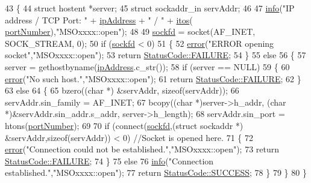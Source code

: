 \begin{DoxyCode}
43 \{
44     \textcolor{keyword}{struct }hostent *server;
45     \textcolor{keyword}{struct }sockaddr\_in servAddr;
46 
47     \hyperlink{classObject_a644fd329ea4cb85f54fa6846484b84a8}{info}(\textcolor{stringliteral}{"IP address / TCP Port: "} + \hyperlink{classMSOxxxx_aa55bdb0feb799b195628fe6ef0222b62}{ipAddress} + \textcolor{stringliteral}{" / "} + \hyperlink{Tools_8h_af330027dbdafb9a30768b3613c553e60}{itos}(
      \hyperlink{classMSOxxxx_a242bcf72c701cd20d86d25315fc6180f}{portNumber}),\textcolor{stringliteral}{"MSOxxxx::open"});
48 
49     \hyperlink{classMSOxxxx_acf030a8f1ddd78d632816c856f50455c}{sockfd} = socket(AF\_INET, SOCK\_STREAM, 0);
50     \textcolor{keywordflow}{if} (\hyperlink{classMSOxxxx_acf030a8f1ddd78d632816c856f50455c}{sockfd} < 0) 
51     \{
52         \hyperlink{classObject_a204a95f57818c0f811933917a30eff45}{error}(\textcolor{stringliteral}{"ERROR opening socket"},\textcolor{stringliteral}{"MSOxxxx::open"});
53         \textcolor{keywordflow}{return} \hyperlink{classStatusCode_a6f565cbeadc76d14c72f047e5e85eb4ba3da73d4c469762eb9d3c960368252b26}{StatusCode::FAILURE};
54     \}
55     \textcolor{keywordflow}{else}
56     \{
57         server = gethostbyname(\hyperlink{classMSOxxxx_aa55bdb0feb799b195628fe6ef0222b62}{ipAddress}.c\_str());
58         \textcolor{keywordflow}{if} (server == NULL)
59         \{
60             \hyperlink{classObject_a204a95f57818c0f811933917a30eff45}{error}(\textcolor{stringliteral}{"No such host."},\textcolor{stringliteral}{"MSOxxxx::open"});
61             \textcolor{keywordflow}{return} \hyperlink{classStatusCode_a6f565cbeadc76d14c72f047e5e85eb4ba3da73d4c469762eb9d3c960368252b26}{StatusCode::FAILURE};
62         \}
63         \textcolor{keywordflow}{else}
64         \{
65             bzero((\textcolor{keywordtype}{char} *) &servAddr, \textcolor{keyword}{sizeof}(servAddr));
66             servAddr.sin\_family = AF\_INET;
67             bcopy((\textcolor{keywordtype}{char} *)server->h\_addr, (\textcolor{keywordtype}{char} *)&servAddr.sin\_addr.s\_addr, server->h\_length);
68             servAddr.sin\_port = htons(\hyperlink{classMSOxxxx_a242bcf72c701cd20d86d25315fc6180f}{portNumber});
69 
70             \textcolor{keywordflow}{if} (connect(\hyperlink{classMSOxxxx_acf030a8f1ddd78d632816c856f50455c}{sockfd},(\textcolor{keyword}{struct} sockaddr *) &servAddr,\textcolor{keyword}{sizeof}(servAddr)) < 0) \textcolor{comment}{//Socket is
       opened here.}
71             \{
72                 \hyperlink{classObject_a204a95f57818c0f811933917a30eff45}{error}(\textcolor{stringliteral}{"Connection could not be established."},\textcolor{stringliteral}{"MSOxxxx::open"});
73                 \textcolor{keywordflow}{return} \hyperlink{classStatusCode_a6f565cbeadc76d14c72f047e5e85eb4ba3da73d4c469762eb9d3c960368252b26}{StatusCode::FAILURE};
74             \}
75             \textcolor{keywordflow}{else} 
76                 \hyperlink{classObject_a644fd329ea4cb85f54fa6846484b84a8}{info}(\textcolor{stringliteral}{"Connection established."},\textcolor{stringliteral}{"MSOxxxx::open"});
77                 \textcolor{keywordflow}{return} \hyperlink{classStatusCode_a6f565cbeadc76d14c72f047e5e85eb4badd0da38d3ba0d922efd1f4619bc37ad8}{StatusCode::SUCCESS};
78         \}
79     \}
80 \}
\end{DoxyCode}
